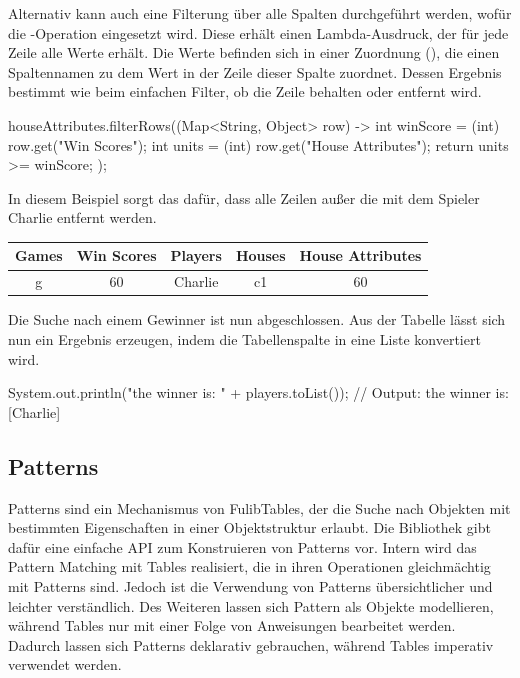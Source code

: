 Alternativ kann auch eine Filterung über alle Spalten durchgeführt werden, wofür die -Operation eingesetzt wird.
Diese erhält einen Lambda-Ausdruck, der für jede Zeile alle Werte erhält.
Die Werte befinden sich in einer Zuordnung (), die einen Spaltennamen zu dem Wert in der Zeile dieser Spalte zuordnet.
Dessen Ergebnis bestimmt wie beim einfachen Filter, ob die Zeile behalten oder entfernt wird.

\begin{jcodeblock}
    houseAttributes.filterRows((Map<String, Object> row) -> {
        int winScore = (int) row.get("Win Scores");
        int units = (int) row.get("House Attributes");
        return units >= winScore;
    });
\end{jcodeblock}

In diesem Beispiel sorgt das dafür, dass alle Zeilen außer die mit dem Spieler Charlie entfernt werden.

\begin{tabular}{|c|c|c|c|c|}
    \hline
    \textbf{Games} & \textbf{Win Scores} & \textbf{Players} & \textbf{Houses} & \textbf{House Attributes} \\
    \hline
    g & 60 & Charlie & c1 & 60 \\
    \hline
\end{tabular}

Die Suche nach einem Gewinner ist nun abgeschlossen.
Aus der Tabelle lässt sich nun ein Ergebnis erzeugen, indem die Tabellenspalte  in eine Liste konvertiert wird.

\begin{jcodeblock}
    System.out.println("the winner is: " + players.toList());
    // Output: the winner is: [Charlie]
\end{jcodeblock}

\subsection{Patterns}\label{subsec:patterns}

Patterns sind ein Mechanismus von FulibTables, der die Suche nach Objekten mit bestimmten Eigenschaften in einer Objektstruktur erlaubt.
Die Bibliothek gibt dafür eine einfache API zum Konstruieren von Patterns vor.
Intern wird das Pattern Matching mit Tables realisiert,
die in ihren Operationen gleichmächtig mit Patterns sind.
Jedoch ist die Verwendung von Patterns übersichtlicher und leichter verständlich.
Des Weiteren lassen sich Pattern als Objekte modellieren,
während Tables nur mit einer Folge von Anweisungen bearbeitet werden.
Dadurch lassen sich Patterns deklarativ gebrauchen, während Tables imperativ verwendet werden.

